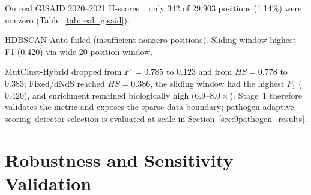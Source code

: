 On real GISAID 2020--2021 H-scores~\cite{youn2025mutclust}, only 342 of 29,903 positions (1.14\%) were nonzero (Table~\ref{tab:real_gisaid}).

\begin{table}[htbp]
\centering
\caption{Real GISAID 2020--2021 H-score benchmark (342 nonzero / 1,251 ground truth positions)}
\label{tab:real_gisaid}
\small
{}
\begin{minipage}{\textwidth}
\smallskip
\footnotesize HDBSCAN-Auto failed (insufficient nonzero positions). Sliding window highest F1 (0.420) via wide 20-position window.
\end{minipage}
\end{table}

MutClust-Hybrid dropped from $F_1=0.785$ to $0.123$ and from $\mathit{HS}=0.778$ to $0.383$; Fixed/dNdS reached $\mathit{HS}=0.386$, the sliding window had the highest $F_1$ ($0.420$), and enrichment remained biologically high ($6.9$--$8.0\times$). Stage~1 therefore validates the metric and exposes the sparse-data boundary; pathogen-adaptive scoring--detector selection is evaluated at scale in Section~\ref{sec:9pathogen_results}.

\section{Robustness and Sensitivity Validation}
\label{sec:robustness_validation}
\label{sec:statistical_validation}
\label{sec:sensitivity_analysis}
\label{sec:temporal}

